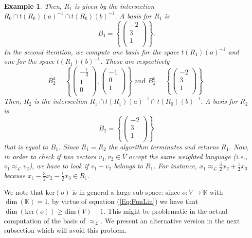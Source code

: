 \documentclass[3p]{elsarticle}
\newcommand{\fL}{\mathcal{L}}    %
\newcommand{\dimn}{\mathrm{dim}}   %
\newcommand{\K}{\mathbb{K}}            %
\newcommand{\kernel}{\mathrm{ker}} %
\newtheorem{example}{Example}
\begin{document}
\begin{example}
%
Then, $R_1$ is given by the intersection $R_0\cap t(R_0)(a)^{-1}
\cap t(R_0)(b)^{-1}$. A basis for $R_1$ is
%
$$B_1=\left\{ \left(%
\begin{array}{c}
  -2 \\
  3\\
  1\\
\end{array}\right)
%
\right \}\text{.}$$
%
In the second iteration, we compute one basis for the space
$t(R_1)(a)^{-1}$ and one for the space $t(R_1)(b)^{-1}$. These are
respectively
$$B_2^a=\left\{ \left(%
\begin{array}{c}
  -\frac{1}{3} \\
  1\\
  0 \\
\end{array}\right),
%
\left(%
\begin{array}{c}
  -1 \\
  0\\
  1 \\
\end{array}\right)
%
\right \}
%
\text{ and }
%
B_2^b=\left\{ \left(%
\begin{array}{c}
  -2 \\
  3\\
  1 \\
\end{array}\right)
%
\right \}
%
\text{.}$$
%
Then, $R_2$ is the intersection $R_1\cap t(R_1)(a)^{-1} \cap
t(R_0)(b)^{-1}$. A basis for $R_2$ is
%
$$B_2=\left\{ \left(%
\begin{array}{c}
  -2 \\
  3\\
  1\\
\end{array}\right)
%
\right \}$$ that is equal to $B_1$. Since $R_1=R_2$ the algorithm
terminates and returns $R_1$. Now, in order to check if two vectors
$v_1, v_2 \in V$ accept the same weighted language (i.e.,
$v_1\approx_\fL v_2$), we have to look if $v_1-v_2$ belongs to
$R_1$. For instance, $x_1 \approx_\fL \frac{3}{2}x_2 +
\frac{1}{2}x_3$ because $x_1 - \frac{3}{2}x_2 - \frac{1}{2}x_3\in
R_1$.
\end{example}


\bigskip

We note that $\kernel(o)$ is in general a large sub-space: since $o
\colon V\rightarrow \K$ with $\dim(\K)=1$, by virtue of equation
(\ref{Eq:FunLin}) we have that $\dim(\kernel(o))\geq \dimn(V)-1$. This
might be problematic in the actual computation of the basis of
$\approx_\fL$. We present an alternative version in the next
subsection which will avoid this problem.
\end{document}
